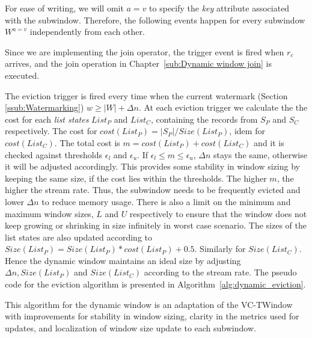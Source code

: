 For ease of writing, we will omit $a=v$ to specify the \emph{key} attribute associated 
with the subwindow. 
Therefore, the following events happen for every subwindow $W^{a=v}$ independently from 
each other. 

Since we are implementing the join operator, the trigger event is fired when  
$r_c$ arrives, and the join operation in Chapter~\ref{sub:Dynamic window join} is 
executed. 


The eviction trigger is fired every time when the current watermark (Section \ref{ssub:Watermarking}) 
$w \ge |W| + \Delta n$. At each eviction trigger we calculate the 
the cost for each \emph{list states} $List_P$ and $List_C$, containing the records from $S_P$ and $S_C$
respectively. The cost for $cost(List_P) = |S_P|/Size(List_P)$, idem for $cost(List_C)$. 
The total cost is $m = cost(List_P) + cost(List_C)$ and it is checked against thresholds $\epsilon_l$ and $\epsilon_u$. If  $\epsilon_l \le m \le \epsilon_u$, 
$\Delta n$ stays the same, otherwise it will be adjusted accordingly. This provides some stability 
in window sizing by keeping the same size, if the cost lies within the thresholds. 
The higher $m$, the higher the stream rate. Thus, the subwindow needs to be frequently 
evicted and lower $\Delta n$ to reduce memory usage. There is also a limit on the 
minimum and maximum window sizes, $L$ and $U$ respectively to ensure that the window 
does not keep growing or shrinking in size infinitely in worst case scenario. 
The sizes of the list states 
are also updated according to $Size(List_P) = Size(List_P) * cost(List_P) + 0.5$.
Similarly for $Size(List_C)$. 
Hence the dynamic window maintains an 
ideal size by adjusting $\Delta n, Size(List_P)$ and $Size(List_C)$ according to 
the stream rate. The pseudo code for the eviction algorithm is presented in Algorithm~\ref{alg:dynamic_eviction}.

This algorithm for the dynamic window is an adaptation of the VC-TWindow~\cite{vctw_join} with 
improvements for stability in window sizing, clarity in the metrics used for updates, and localization 
of window size update to each subwindow.  

